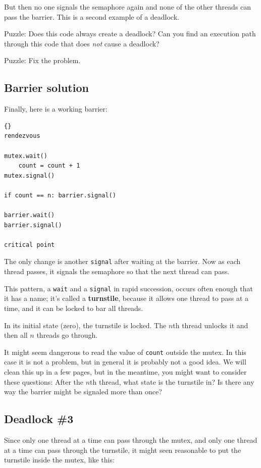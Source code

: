 \documentclass{book}
\newcommand{\clearemptydoublepage}{\newpage\cleardoublepage}
\begin{document}
But then no one signals the semaphore again and none of the
other threads can pass the barrier.
This is a second example of a deadlock.

Puzzle: Does this code always create a deadlock?  Can you find an
execution path through this code that does {\em not} cause a deadlock?

Puzzle: Fix the problem.


\clearemptydoublepage
\subsection{Barrier solution}
\label{barrier}

Finally, here is a working barrier:

\begin{lstlisting}[title={Barrier solution}]{}
rendezvous

mutex.wait()
    count = count + 1
mutex.signal()

if count == n: barrier.signal()

barrier.wait()
barrier.signal()

critical point
\end{lstlisting}

The only change is another {\tt signal} after waiting
at the barrier.  Now as each thread passes, it signals the
semaphore so that the next thread can pass.

This pattern, a {\tt wait} and a {\tt signal} in rapid
succession, occurs often enough that it has a name;
it's called a {\bf turnstile}, because it allows one thread to pass
at a time, and it can be locked to bar all threads.

In its initial state (zero), the turnstile is locked.  The $n$th
thread unlocks it and then all $n$ threads go through.

It might seem dangerous to read the value of {\tt count} outside the
mutex.  In this case it is not a problem, but in general it is
probably not a good idea.  We will clean this up in a few pages, but
in the meantime, you might want to consider these questions: After the
$n$th thread, what state is the turnstile in?  Is there any way the
barrier might be signaled more than once?


\clearemptydoublepage
\subsection {Deadlock \#3}

Since only one thread at a time can pass through the
mutex, and only one thread at a time can pass through
the turnstile, it might seen reasonable to put the
turnstile inside the mutex, like this:
\end{document}
